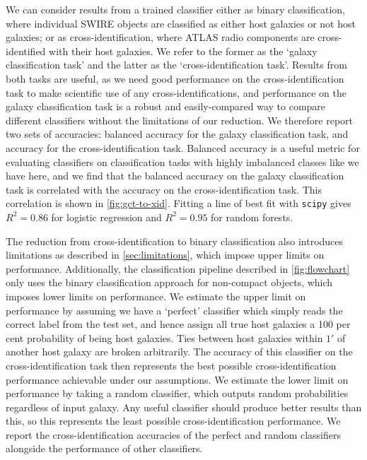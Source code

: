 \documentclass[fleqn,usenatbib,usedcolumn]{mnras}
\begin{document}
    We can consider results from a trained classifier either as binary
    classification, where individual SWIRE objects are classified as either
    host galaxies or not host galaxies; or as cross-identification, where
    ATLAS radio components are cross-identified with their host galaxies. We
    refer to the former as the `galaxy classification task' and the latter as
    the `cross-identification task'. Results from both tasks are useful, as we
    need good performance on the cross-identification task to make scientific
    use of any cross-identifications, and performance on the galaxy
    classification task is a robust and easily-compared way to compare
    different classifiers without the limitations of our reduction. We
    therefore report two sets of accuracies: balanced accuracy for the galaxy
    classification task, and accuracy for the cross-identification task.
    Balanced accuracy is a useful metric for evaluating classifiers on
    classification tasks with highly imbalanced classes like we have here, and
    we find that the balanced accuracy on the galaxy classification task is
    correlated with the accuracy on the cross-identification task. This
    correlation is shown in \autoref{fig:gct-to-xid}. Fitting a line of best
    fit with \texttt{scipy} gives $R^2 = 0.86$ for logistic regression and
    $R^2 = 0.95$ for random forests.

    The reduction from cross-identification to binary classification also
    introduces limitations as described in \autoref{sec:limitations}, which
    impose upper limits on performance. Additionally, the classification
    pipeline described in \autoref{fig:flowchart} only uses the binary
    classification approach for non-compact objects, which imposes lower
    limits on performance. We estimate the upper limit on performance by
    assuming we have a `perfect' classifier which simply reads the correct
    label from the test set, and hence assign all true host galaxies a 100 per
    cent probability of being host galaxies. Ties between host galaxies within
    $1'$ of another host galaxy are broken arbitrarily. The accuracy of this
    classifier on the cross-identification task then represents the best
    possible cross-identification performance achievable under our
    assumptions. We estimate the lower limit on performance by taking a random
    classifier, which outputs random probabilities regardless of input galaxy.
    Any useful classifier should produce better results than this, so this
    represents the least possible cross-identification performance. We report
    the cross-identification accuracies of the perfect and random classifiers
    alongside the performance of other classifiers.
\end{document}

